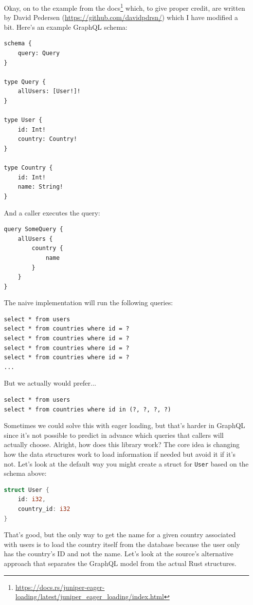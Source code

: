 Okay, on to the example from the docs\footnote{\url{https://docs.rs/juniper-eager-loading/latest/juniper_eager_loading/index.html}} which, to give proper credit, are written by David Pedersen (\url{https://github.com/davidpdrsn/}) which I have modified a bit. Here's an example GraphQL schema:

\begin{lstlisting}
schema {
    query: Query
}

type Query {
    allUsers: [User!]!
}

type User {
    id: Int!
    country: Country!
}

type Country {
    id: Int!
    name: String!
}
\end{lstlisting}

And a caller executes the query:
\begin{lstlisting}
query SomeQuery {
    allUsers {
        country {
            name
        }
    }
}
\end{lstlisting}

The naive implementation will run the following queries:
\begin{lstlisting}
select * from users
select * from countries where id = ?
select * from countries where id = ?
select * from countries where id = ?
select * from countries where id = ?
...
\end{lstlisting}

But we actually would prefer...
\begin{lstlisting}
select * from users
select * from countries where id in (?, ?, ?, ?)
\end{lstlisting}

Sometimes we could solve this with eager loading, but that's harder in GraphQL since it's not possible to predict in advance which queries that callers will actually choose. Alright, how does this library work? The core idea is changing how the data structures work to load information if needed but avoid it if it's not. Let's look at the default way you might create a struct for \texttt{User} based on the schema above:

\begin{lstlisting}[language=Rust]
struct User {
    id: i32,
    country_id: i32
}
\end{lstlisting}
That's good, but the only way to get the name for a given country associated with users is to load the country itself from the database because the user only has the country's ID and not the name. Let's look at the source's alternative approach that separates the GraphQL model from the actual Rust structures.

